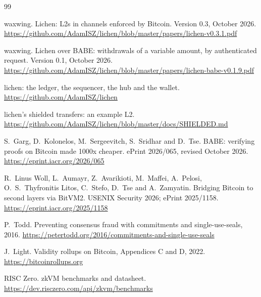 \documentclass[11pt]{article}
\begin{document}
\begin{thebibliography}{99}

 waxwing. Lichen: L2s in channels enforced by Bitcoin. Version 0.3, October 2026. \url{https://github.com/AdamISZ/lichen/blob/master/papers/lichen-v0.3.1.pdf}

 waxwing. Lichen over BABE: withdrawals of a variable amount, by authenticated request. Version 0.1, October 2026. \url{https://github.com/AdamISZ/lichen/blob/master/papers/lichen-babe-v0.1.9.pdf}

 lichen: the ledger, the sequencer, the hub and the wallet. \url{https://github.com/AdamISZ/lichen}

 lichen's shielded transfers: an example L2. \url{https://github.com/AdamISZ/lichen/blob/master/docs/SHIELDED.md}

 S.~Garg, D.~Kolonelos, M.~Sergeevitch, S.~Sridhar and D.~Tse. BABE: verifying proofs on Bitcoin made 1000x cheaper. ePrint 2026/065, revised October 2026. \url{https://eprint.iacr.org/2026/065}

 R.~Linus Woll, L.~Aumayr, Z.~Avarikioti, M.~Maffei, A.~Pelosi, O.~S.~Thyfronitis Litos, C.~Stefo, D.~Tse and A.~Zamyatin. Bridging Bitcoin to second layers via BitVM2. USENIX Security 2026; ePrint 2025/1158. \url{https://eprint.iacr.org/2025/1158}

 P.~Todd. Preventing consensus fraud with commitments and single-use-seals, 2016. \url{https://petertodd.org/2016/commitments-and-single-use-seals}

 J.~Light. Validity rollups on Bitcoin, Appendices C and D, 2022. \url{https://bitcoinrollups.org}

 RISC Zero. zkVM benchmarks and datasheet. \url{https://dev.risczero.com/api/zkvm/benchmarks}

\end{thebibliography}
\end{document}
